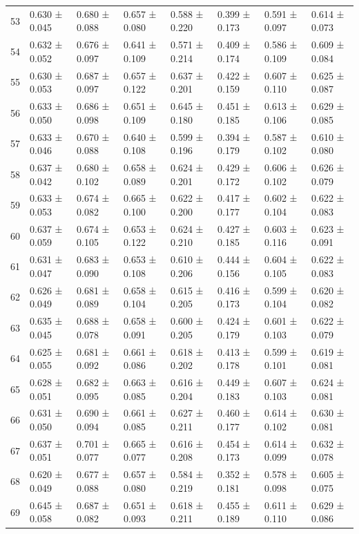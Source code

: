 \begin{tabular}{llllllll}
53 & 0.630 ± 0.045 & 0.680 ± 0.088 & 0.657 ± 0.080 & 0.588 ± 0.220 & 0.399 ± 0.173 & 0.591 ± 0.097 & 0.614 ± 0.073 \\
54 & 0.632 ± 0.052 & 0.676 ± 0.097 & 0.641 ± 0.109 & 0.571 ± 0.214 & 0.409 ± 0.174 & 0.586 ± 0.109 & 0.609 ± 0.084 \\
55 & 0.630 ± 0.053 & 0.687 ± 0.097 & 0.657 ± 0.122 & 0.637 ± 0.201 & 0.422 ± 0.159 & 0.607 ± 0.110 & 0.625 ± 0.087 \\
56 & 0.633 ± 0.050 & 0.686 ± 0.098 & 0.651 ± 0.109 & 0.645 ± 0.180 & 0.451 ± 0.185 & 0.613 ± 0.106 & 0.629 ± 0.085 \\
57 & 0.633 ± 0.046 & 0.670 ± 0.088 & 0.640 ± 0.108 & 0.599 ± 0.196 & 0.394 ± 0.179 & 0.587 ± 0.102 & 0.610 ± 0.080 \\
58 & 0.637 ± 0.042 & 0.680 ± 0.102 & 0.658 ± 0.089 & 0.624 ± 0.201 & 0.429 ± 0.172 & 0.606 ± 0.102 & 0.626 ± 0.079 \\
59 & 0.633 ± 0.053 & 0.674 ± 0.082 & 0.665 ± 0.100 & 0.622 ± 0.200 & 0.417 ± 0.177 & 0.602 ± 0.104 & 0.622 ± 0.083 \\
60 & 0.637 ± 0.059 & 0.674 ± 0.105 & 0.653 ± 0.122 & 0.624 ± 0.210 & 0.427 ± 0.185 & 0.603 ± 0.116 & 0.623 ± 0.091 \\
61 & 0.631 ± 0.047 & 0.683 ± 0.090 & 0.653 ± 0.108 & 0.610 ± 0.206 & 0.444 ± 0.156 & 0.604 ± 0.105 & 0.622 ± 0.083 \\
62 & 0.626 ± 0.049 & 0.681 ± 0.089 & 0.658 ± 0.104 & 0.615 ± 0.205 & 0.416 ± 0.173 & 0.599 ± 0.104 & 0.620 ± 0.082 \\
63 & 0.635 ± 0.045 & 0.688 ± 0.078 & 0.658 ± 0.091 & 0.600 ± 0.205 & 0.424 ± 0.179 & 0.601 ± 0.103 & 0.622 ± 0.079 \\
64 & 0.625 ± 0.055 & 0.681 ± 0.092 & 0.661 ± 0.086 & 0.618 ± 0.202 & 0.413 ± 0.178 & 0.599 ± 0.101 & 0.619 ± 0.081 \\
65 & 0.628 ± 0.051 & 0.682 ± 0.095 & 0.663 ± 0.085 & 0.616 ± 0.204 & 0.449 ± 0.183 & 0.607 ± 0.103 & 0.624 ± 0.081 \\
66 & 0.631 ± 0.050 & 0.690 ± 0.094 & 0.661 ± 0.085 & 0.627 ± 0.211 & 0.460 ± 0.177 & 0.614 ± 0.102 & 0.630 ± 0.081 \\
67 & 0.637 ± 0.051 & 0.701 ± 0.077 & 0.665 ± 0.077 & 0.616 ± 0.208 & 0.454 ± 0.173 & 0.614 ± 0.099 & 0.632 ± 0.078 \\
68 & 0.620 ± 0.049 & 0.677 ± 0.088 & 0.657 ± 0.080 & 0.584 ± 0.219 & 0.352 ± 0.181 & 0.578 ± 0.098 & 0.605 ± 0.075 \\
69 & 0.645 ± 0.058 & 0.687 ± 0.082 & 0.651 ± 0.093 & 0.618 ± 0.211 & 0.455 ± 0.189 & 0.611 ± 0.110 & 0.629 ± 0.086 \\

\end{tabular}
